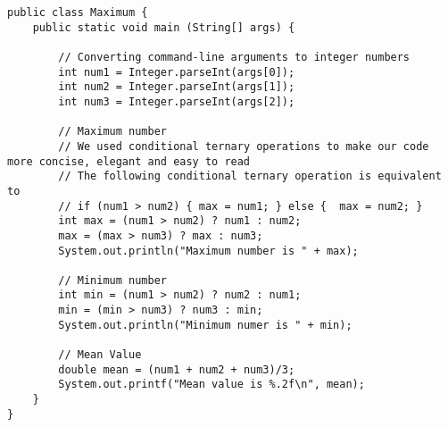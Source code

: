 \documentclass[12pt,letterpaper,twoside]{article}
\begin{document}
\lstset{language=Java}
\begin{lstlisting}
public class Maximum {
	public static void main (String[] args) {

		// Converting command-line arguments to integer numbers
		int num1 = Integer.parseInt(args[0]);
		int num2 = Integer.parseInt(args[1]);
		int num3 = Integer.parseInt(args[2]);

		// Maximum number
		// We used conditional ternary operations to make our code more concise, elegant and easy to read
		// The following conditional ternary operation is equivalent to
		// if (num1 > num2) { max = num1; } else {	max = num2; }
		int max = (num1 > num2) ? num1 : num2;
		max = (max > num3) ? max : num3;
		System.out.println("Maximum number is " + max);

		// Minimum number
		int min = (num1 > num2) ? num2 : num1;
		min = (min > num3) ? num3 : min;
		System.out.println("Minimum numer is " + min);

		// Mean Value
		double mean = (num1 + num2 + num3)/3;
		System.out.printf("Mean value is %.2f\n", mean);
	}
}
\end{lstlisting}
\end{document}
